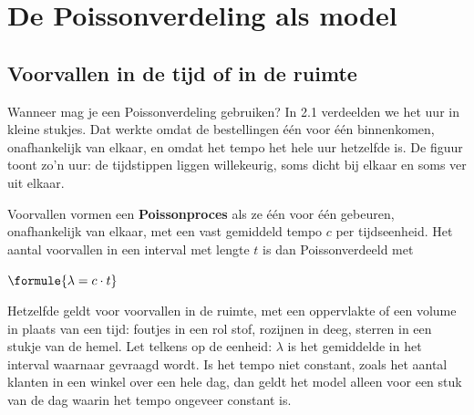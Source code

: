 \begin{oefeningen}
\end{oefeningen}

\section{De Poissonverdeling als model}

\subsection{Voorvallen in de tijd of in de ruimte}

Wanneer mag je een Poissonverdeling gebruiken? In 2.1 verdeelden we het uur in kleine stukjes. Dat werkte omdat de bestellingen één voor één binnenkomen, onafhankelijk van elkaar, en omdat het tempo het hele uur hetzelfde is. De figuur toont zo'n uur: de tijdstippen liggen willekeurig, soms dicht bij elkaar en soms ver uit elkaar.


\vspace{-1mm}
\begin{theorie}
Voorvallen vormen een \textbf{\textcolor{accent}{Poissonproces}} als ze één voor één gebeuren, onafhankelijk van elkaar, met een vast gemiddeld tempo $c$ per tijdseenheid. Het aantal voorvallen in een interval met lengte $t$ is dan Poissonverdeeld met

\vspace{1mm}
\qquad $\formule{\lambda = c \cdot t}$
\end{theorie}

Hetzelfde geldt voor voorvallen in de ruimte, met een oppervlakte of een volume in plaats van een tijd: foutjes in een rol stof, rozijnen in deeg, sterren in een stukje van de hemel. Let telkens op de eenheid: $\lambda$ is het gemiddelde in het interval waarnaar gevraagd wordt. Is het tempo niet constant, zoals het aantal klanten in een winkel over een hele dag, dan geldt het model alleen voor een stuk van de dag waarin het tempo ongeveer constant is.

